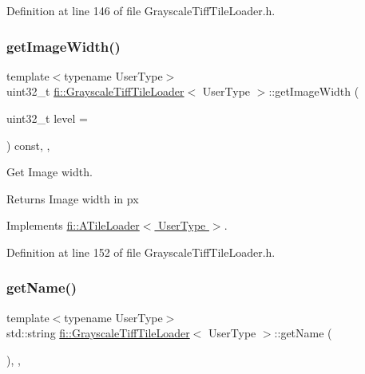 Definition at line 146 of file Grayscale\+Tiff\+Tile\+Loader.\+h.

\mbox{\label{classfi_1_1GrayscaleTiffTileLoader_ab20446c55b7ae2fea97490e76a73f934}} 
\subsubsection{\texorpdfstring{get\+Image\+Width()}{getImageWidth()}}
{\footnotesize\ttfamily template$<$typename User\+Type$>$ \\
uint32\+\_\+t \hyperlink{classfi_1_1GrayscaleTiffTileLoader}{fi\+::\+Grayscale\+Tiff\+Tile\+Loader}$<$ User\+Type $>$\+::get\+Image\+Width (\begin{DoxyParamCaption}\item[{uint32\+\_\+t}]{level = {} }\end{DoxyParamCaption}) const\hspace{0.3cm}{\ttfamily [inline]}, {\ttfamily [override]}, {\ttfamily [virtual]}}



Get Image width. 

\begin{DoxyReturn}{Returns}
Image width in px 
\end{DoxyReturn}


Implements \hyperlink{classfi_1_1ATileLoader_ad775bcbdddf7da6bb3f857a53c075a86}{fi\+::\+A\+Tile\+Loader$<$ User\+Type $>$}.



Definition at line 152 of file Grayscale\+Tiff\+Tile\+Loader.\+h.

\mbox{\label{classfi_1_1GrayscaleTiffTileLoader_a66be68fc0c11aefbcb141ddb8c9e4deb}} 
\subsubsection{\texorpdfstring{get\+Name()}{getName()}}
{\footnotesize\ttfamily template$<$typename User\+Type$>$ \\
std\+::string \hyperlink{classfi_1_1GrayscaleTiffTileLoader}{fi\+::\+Grayscale\+Tiff\+Tile\+Loader}$<$ User\+Type $>$\+::get\+Name (\begin{DoxyParamCaption}{ }\end{DoxyParamCaption})\hspace{0.3cm}{\ttfamily [inline]}, {\ttfamily [override]}, {\ttfamily [virtual]}}



